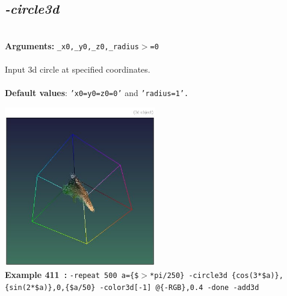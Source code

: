 \documentclass[a4paper,11pt,twoside]{book}
\begin{document}
\subsection{\emph{-circle3d} }\vspace*{-0.5em}
~\\\textbf{Arguments: } 
{\small \texttt{\_x0,\_y0,\_z0,\_radius$>$=0}}\\~\\
Input 3d circle at specified coordinates.
~\\~\\\textbf{Default values}: {\small \texttt{'x0=y0=z0=0'} and \texttt{'radius=1'.}}
\begin{center}\includegraphics[keepaspectratio=true,height=7cm,width=\textwidth]{img/gmic_def411.jpg}\\
{\footnotesize \textbf{Example 411~:} \texttt{-repeat 500 a=\{\$$>$*pi/250\} -circle3d \{cos(3*\$a)\},\{sin(2*\$a)\},0,\{\$a/50\} -color3d[-1] @\{-RGB\},0.4 -done -add3d}}
\end{center}
\end{document}
